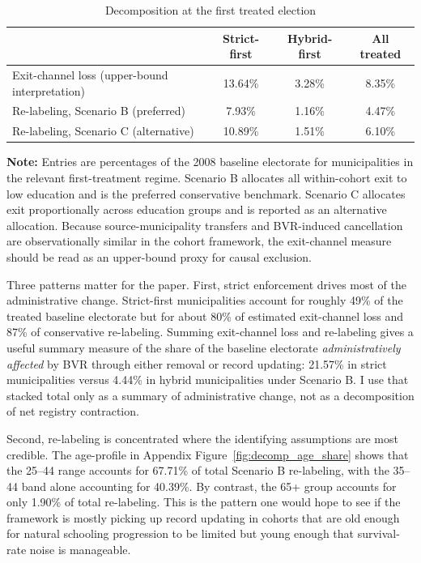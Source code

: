 \begin{table}[!htbp]
\centering
\caption{Decomposition at the first treated election}
\label{tab:decomp_aggregate}
\label{tab:decomp_rates}
\begin{tabular}{lccc}
\toprule
 & Strict-first & Hybrid-first & All treated \\
\midrule
Exit-channel loss (upper-bound interpretation) & 13.64\% & 3.28\% & 8.35\% \\
Re-labeling, Scenario B (preferred) & 7.93\% & 1.16\% & 4.47\% \\
Re-labeling, Scenario C (alternative) & 10.89\% & 1.51\% & 6.10\% \\
\bottomrule
\end{tabular}

\vspace{0.75em}
\begin{minipage}{\textwidth}
{\footnotesize \textbf{Note:} Entries are percentages of the 2008 baseline electorate for municipalities in the relevant first-treatment regime. Scenario B allocates all within-cohort exit to low education and is the preferred conservative benchmark. Scenario C allocates exit proportionally across education groups and is reported as an alternative allocation. Because source-municipality transfers and BVR-induced cancellation are observationally similar in the cohort framework, the exit-channel measure should be read as an upper-bound proxy for causal exclusion. \par}
\end{minipage}
\end{table}

Three patterns matter for the paper. First, strict enforcement drives most of the administrative change. Strict-first municipalities account for roughly 49\% of the treated baseline electorate but for about 80\% of estimated exit-channel loss and 87\% of conservative re-labeling. Summing exit-channel loss and re-labeling gives a useful summary measure of the share of the baseline electorate \emph{administratively affected} by BVR through either removal or record updating: 21.57\% in strict municipalities versus 4.44\% in hybrid municipalities under Scenario B. I use that stacked total only as a summary of administrative change, not as a decomposition of net registry contraction.

Second, re-labeling is concentrated where the identifying assumptions are most credible. The age-profile in Appendix Figure~\ref{fig:decomp_age_share} shows that the 25--44 range accounts for 67.71\% of total Scenario B re-labeling, with the 35--44 band alone accounting for 40.39\%. By contrast, the 65+ group accounts for only 1.90\% of total re-labeling. This is the pattern one would hope to see if the framework is mostly picking up record updating in cohorts that are old enough for natural schooling progression to be limited but young enough that survival-rate noise is manageable.

